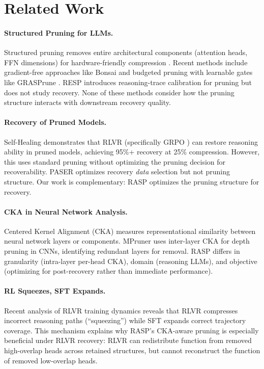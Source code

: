 \documentclass[11pt,a4paper]{article}
\begin{document}
\section{Related Work}

\paragraph{Structured Pruning for LLMs.}
Structured pruning removes entire architectural components (attention heads, FFN dimensions) for hardware-friendly compression \cite{llmpruner2023,sheared2024}. Recent methods include gradient-free approaches like Bonsai \cite{bonsai2025} and budgeted pruning with learnable gates like GRASPrune \cite{graspune2026}. RESP \cite{resp2025} introduces reasoning-trace calibration for pruning but does not study recovery. None of these methods consider how the pruning structure interacts with downstream recovery quality.

\paragraph{Recovery of Pruned Models.}
Self-Healing \cite{selfhealing2025} demonstrates that RLVR (specifically GRPO \cite{grpo2024}) can restore reasoning ability in pruned models, achieving 95\%+ recovery at 25\% compression. However, this uses standard pruning without optimizing the pruning decision for recoverability. PASER \cite{paser2025} optimizes recovery \emph{data} selection but not pruning structure. Our work is complementary: RASP optimizes the pruning structure for recovery.

\paragraph{CKA in Neural Network Analysis.}
Centered Kernel Alignment (CKA) \cite{cka2019} measures representational similarity between neural network layers or components. MPruner \cite{mpruner2024} uses inter-layer CKA for depth pruning in CNNs, identifying redundant layers for removal. RASP differs in granularity (intra-layer per-head CKA), domain (reasoning LLMs), and objective (optimizing for post-recovery rather than immediate performance).

\paragraph{RL Squeezes, SFT Expands.}
Recent analysis of RLVR training dynamics \cite{rlsqueezes2026} reveals that RLVR compresses incorrect reasoning paths (``squeezing'') while SFT expands correct trajectory coverage. This mechanism explains why RASP's CKA-aware pruning is especially beneficial under RLVR recovery: RLVR can redistribute function from removed high-overlap heads across retained structures, but cannot reconstruct the function of removed low-overlap heads.
\end{document}
